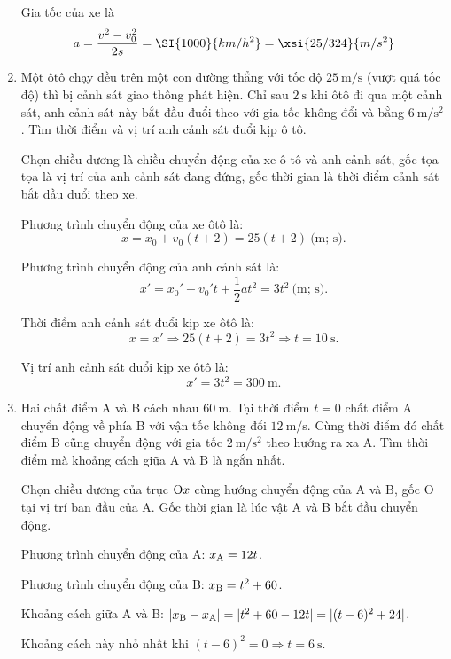 \begin{enumerate}[label=\bfseries Câu \arabic*:]
	\loigiai
	{Gia tốc của xe là
		$$a=\dfrac{v^2-v_0^2}{2s} = \SI{1000}{km/h^2} = \xsi{25/324}{m/s^2}$$
	}
	\item {}
	
	\cauhoi
	{Một ôtô chạy đều trên một con đường thẳng với tốc độ $\SI{25}{\meter/\second}$ (vượt quá tốc độ) thì bị cảnh sát giao thông phát hiện. Chỉ sau $\SI{2}{\second}$ khi ôtô đi qua một cảnh sát, anh cảnh sát này bắt đầu đuổi theo với gia tốc không đổi và bằng $\SI{6}{\meter/\second^2}$. Tìm thời điểm và vị trí anh cảnh sát đuổi kịp ô tô.
	}
	
	\loigiai
	{	Chọn chiều dương là chiều chuyển động của xe ô tô và anh cảnh sát, gốc tọa tọa là vị trí của anh cảnh sát đang đứng, gốc thời gian là thời điểm cảnh sát bắt đầu đuổi theo xe.
		
		Phương trình chuyển động của xe ôtô là:
		$$x=x_0+v_0(t+2)=25(t+2)\ \text{(m; s)}.$$
		
		Phương trình chuyển động của anh cảnh sát là:
		$$x'=x_0'+v_0't+\dfrac{1}{2}at^2=3t^2\ \text{(m; s)}.$$
		
		Thời điểm anh cảnh sát đuổi kịp xe ôtô là:
		$$x=x'\Rightarrow 25(t+2)=3t^2\Rightarrow t=\SI{10}{\second}.$$
		
		Vị trí anh cảnh sát đuổi kịp xe ôtô là:
		$$x'=3t^2=\SI{300}{\meter}.$$
	}
	\item {}
	
	\cauhoi
	{Hai chất điểm A và B cách nhau $\SI{60}{\meter}$. Tại thời điểm $t=0$ chất điểm A chuyển động về phía B với vận tốc không đổi $\SI{12}{\meter / \second}$. Cùng thời điểm đó chất điểm B cũng chuyển động với gia tốc $\SI{2}{\meter / \second \squared}$ theo hướng ra xa A. Tìm thời điểm mà khoảng cách giữa A và B là ngắn nhất.
	}
	
	\loigiai
	{Chọn chiều dương của trục $\text O x$ cùng hướng chuyển động của A và B, gốc O tại vị trí ban đầu của A. Gốc thời gian là lúc vật A và B bắt đầu chuyển động.
		
		Phương trình chuyển động của A: $x_\text A = 12t$.
		
		Phương trình chuyển động của B: $x_\text B = t^2 + 60$.
		
		Khoảng cách giữa A và B: $|x_\text B - x_\text A |=|t^2+60-12t|=|(t-6)^2+24|$.
		
		Khoảng cách này nhỏ nhất khi $(t-6)^2 = 0 \Rightarrow t=\SI{6}{\second}$.
	}
\end{enumerate}